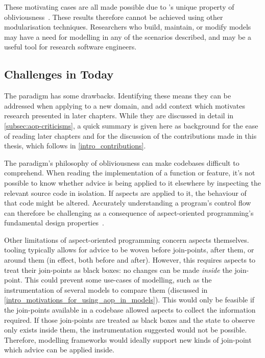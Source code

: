 These motivating cases are all made possible due to \aop{}'s unique property of
obliviousness~\cite{filman2000aspect}. These results therefore cannot be
achieved using other modularisation techniques. Researchers who build, maintain,
or modify models may have a need for \aspectoriented{} modelling in any of the
scenarios described, and \aop{} may be a useful tool for research software
engineers.



\subsection{Challenges in \AspectOrientation{} Today}
\label{challenges_in_aop_briefly}

The \aspectoriented{} paradigm has some drawbacks. Identifying these means they
can be addressed when applying \aop{} to a new domain, and add context which
motivates research presented in later chapters. While they are discussed in
detail in \cref{subsec:aop-criticisms}, a quick summary is given here as
background for the ease of reading later chapters and for the discussion of the
contributions made in this thesis, which follows in \cref{intro_contributions}.

The paradigm's philosophy of obliviousness can make codebases difficult to
comprehend. When reading the implementation of a function or feature, it's not
possible to know whether advice is being applied to it elsewhere by inspecting
the relevant source code in isolation. If aspects are applied to it, the
behaviour of that code might be altered. Accurately understanding a program's
control flow can therefore be challenging as a consequence of aspect-oriented
programming's fundamental design
properties~\cite{Constantinides04aopconsidered,przybylek2010wrong}.

Other limitations of aspect-oriented programming concern aspects themselves.
\Aspectorientation{} tooling typically allows for advice to be woven before
join-points, after them, or around them (in effect, both before and after).
However, this requires aspects to treat their join-points as black boxes: no
changes can be made \emph{inside} the join-point. This could prevent some
use-cases of \aspectoriented{} modelling, such as the instrumentation of several
models to compare them (discussed in
\cref{intro_motivations_for_using_aop_in_models}). This would only be feasible
if the join-points available in a codebase allowed aspects to collect the
information required. If those join-points are treated as black boxes and the
state to observe only exists inside them, the instrumentation suggested would
not be possible. Therefore, \aspectoriented{} modelling frameworks would ideally
support new kinds of join-point which advice can be applied inside.

